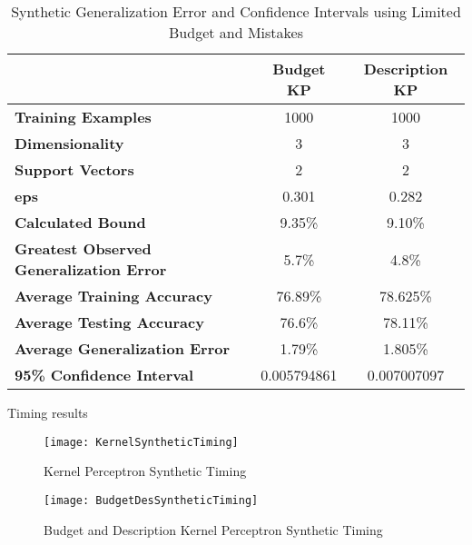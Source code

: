 \begin{table}[h!]
 \begin{center}
  \caption{Synthetic Generalization Error and Confidence Intervals using Limited Budget and Mistakes}
  \label{tab:syntheticlimitedgen}
  \begin{tabular}{l|c|c}
  \textbf{ } & \textbf{Budget KP} & \textbf{Description KP}\\
  \hline
  \textbf{Training Examples} & 1000 & 1000\\
  \textbf{Dimensionality} & 3 & 3\\
  \textbf{Support Vectors} & 2 & 2\\
  \textbf{eps} & 0.301 & 0.282\\
  \hline
  \textbf{Calculated Bound} & 9.35\% & 9.10\%\\
  \textbf{Greatest Observed Generalization Error} & 5.7\% & 4.8\%\\
  \hline
  \textbf{Average Training Accuracy} & 76.89\% & 78.625\%\\
  \textbf{Average Testing Accuracy} & 76.6\% & 78.11\%\\
  \textbf{Average Generalization Error} & 1.79\% & 1.805\%\\
  \textbf{95\% Confidence Interval} & 0.005794861 & 0.007007097\\
  \end{tabular}
 \end{center}
\end{table}

Timing results

\begin{figure}[h]\label{SyntheticKernelTiming}
 \caption{Kernel Perceptron Synthetic Timing}
 \texttt{[image: KernelSyntheticTiming]}
\end{figure}

\begin{figure}[h]\label{SyntheticBudgetDesTiming}
 \caption{Budget and Description Kernel Perceptron Synthetic Timing}
 \texttt{[image: BudgetDesSyntheticTiming]}
\end{figure}

